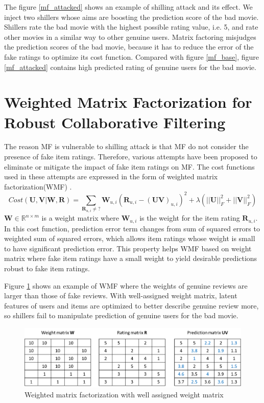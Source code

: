 \documentclass[master,english,final]{kaist-ucs}
\begin{document}
The figure \ref{mf_attacked} shows an example of shilling attack and its effect. We inject two shillers whose aims are boosting the prediction score of the bad movie.
Shillers rate the bad movie with the highest possible rating value, i.e. 5, and rate other movies in a similar way to other genuine users.
Matrix factoring misjudges the prediction scores of the bad movie, because it has to reduce the error of the fake ratings to optimize its cost function.
Compared with figure \ref{mf_base}, figure \ref{mf_attacked} contains high predicted rating of genuine users for the bad movie.


\section{Weighted Matrix Factorization for Robust Collaborative Filtering}
The reason MF is vulnerable to shilling attack is that MF do not consider the presence of fake item ratings.
Therefore, various attempts have been proposed to eliminate or mitigate the impact of fake item ratings on MF.
The cost functions used in these attempts are expressed in the form of weighted matrix factorization(WMF) \cite{ImplicitCF}.
\begin{equation}
Cost(\bm{U},\bm{V} | \bm{W}, \bm{R})=\sum_{\bm{R}_{u,i} \neq ?} \bm{W}_{u,i}(  \bm{R}_{u,i} - (\bm{UV})_{u,i} )^2 + \lambda(||\bm{U}||_F^2+||\bm{V}||_F^2)
\end{equation}
$\bm{W} \in \mathbb{R}^{n \times m}$ is a weight matrix where $\bm{W}_{u,i}$ is the weight for the item rating $\bm{R}_{u,i}$.
In this cost function, prediction error term changes from sum of squared errors to weighted sum of squared errors, which allows item ratings whose weight is small to have significant prediction error.
This property helps WMF based on weight matrix where fake item ratings have a small weight to yield desirable predictions robust to fake item ratings.

Figure \ref{wmf_good} shows an example of WMF where the weights of genuine reviews are larger than those of fake reviews.
With well-assigned weight matrix, latent features of users and items are optimized to better describe genuine review more, so shillers fail to manipulate prediction of genuine users for the bad movie.
\begin{figure}[h]
    \centerline{\includegraphics[width=12.5cm]{figure/wmf_good}}
    \caption{Weighted matrix factorization with well assigned weight matrix} \label{wmf_good}
\end{figure}
\end{document}
